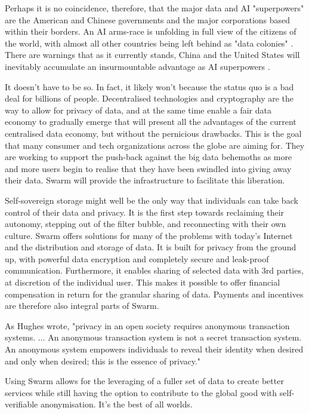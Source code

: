 Perhaps it is no coincidence, therefore, that the major data and AI "superpowers" are the American and Chinese governments and the major corporations based within their borders. An AI arms-race is unfolding in full view of the citizens of the world,  with almost all other countries being left behind as "data colonies" \cite{HarariDavos2020Mar}. There are warnings that as it currently stands, China and the United States will inevitably accumulate an insurmountable advantage as AI superpowers \cite{Lee2018Sep}.

It doesn't have to be so. In fact, it likely won't because the status quo is a bad deal for billions of people. Decentralised technologies and cryptography are the way to allow for privacy of data, and at the same time enable a fair data economy to gradually emerge that will present all the advantages of the current centralised data economy, but without the pernicious drawbacks. This is the goal that many consumer and tech organizations across the globe are aiming for. They are working to support the push-back against the big data behemoths as more and more users begin to realise that they have been swindled into giving away their data. Swarm will provide the infrastructure to facilitate this liberation.

Self-sovereign storage might well be the only way that individuals can take back control of their data and privacy. It is the first step towards reclaiming their autonomy, stepping out of the filter bubble, and reconnecting with their own culture. Swarm offers solutions for many of the problems with today's Internet and the distribution and storage of data. It is built for privacy from the ground up, with powerful data encryption and completely secure and leak-proof communication. Furthermore, it enables sharing of selected data with 3rd parties, at discretion of the individual user. This makes it possible to offer financial compensation in return for the granular sharing of data. Payments and incentives are therefore also integral parts of Swarm.

As Hughes wrote, "privacy in an open society requires anonymous transaction systems. ... An anonymous transaction system is not a secret transaction system. An anonymous system empowers individuals to reveal their identity when desired and only when desired; this is the essence of privacy."

Using Swarm allows for the leveraging of a fuller set of data to create better services while still having the option to contribute to the global good with self-verifiable anonymisation. It's the best of all worlds.

